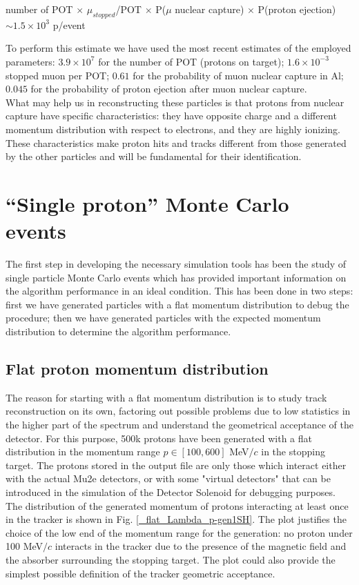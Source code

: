 \documentclass[12pt,a4paper,openright, oneside, titlepage]{book} %
\begin{document}
\begin{center}
\begin{footnotesize}
number of POT $\times$ $\mu_{stopped}$/POT $\times$ P($\mu$ nuclear capture) $\times$ P(proton ejection) $\sim 1.5\times10^3$ p/event
\end{footnotesize}
\end{center}
To perform this estimate we have used the most recent estimates of the employed parameters: 
$3.9\times10^7$ for the number of POT (protons on target); 
$1.6\times10^{-3}$ stopped muon per POT; 
$0.61$ for the probability of muon nuclear capture in Al; 
$0.045$ for the probability of proton ejection after muon nuclear capture.\\
What may help us in reconstructing these particles is that protons from nuclear capture
have specific characteristics: they have opposite charge 
and a different momentum distribution with respect to electrons,
and they are highly ionizing.
These characteristics make proton hits and tracks different 
from those generated by the other particles and will be fundamental for their identification.

\section{``Single proton'' Monte Carlo events}
The first step in developing the necessary simulation tools has been the study of single particle 
Monte Carlo events which has provided important information on the algorithm performance
in an ideal condition. 
This has been done in two steps: 
first we have generated particles with a flat momentum distribution
to debug the procedure; 
then we have generated particles with the expected momentum distribution
to determine the algorithm performance.

\subsection{Flat proton momentum distribution}
The reason for starting with a flat momentum distribution is to study track reconstruction on its own, 
factoring out possible problems due to low statistics in the higher part of the spectrum 
and understand the geometrical acceptance of the detector. 
For this purpose, 500k protons have been generated 
with a flat distribution in the momentum range $p\in[100,600]$ MeV$/c$ in the stopping target. 
The protons stored in the output file are only those which interact either with the actual Mu2e detectors, 
or with some "virtual detectors" that can be introduced in the simulation 
of the Detector Solenoid for debugging purposes.\\
The distribution of the generated momentum of protons interacting 
at least once in the tracker is shown in Fig. \ref{_flat_Lambda_p-gen1SH}. 
The plot justifies the choice of the low end of the momentum range for the generation: 
no proton under 100 MeV$/c$ interacts in the tracker due to the presence 
of the magnetic field and the absorber surrounding the stopping target. 
The plot could also provide the simplest possible definition 
of the tracker geometric acceptance. \\
\end{document}
